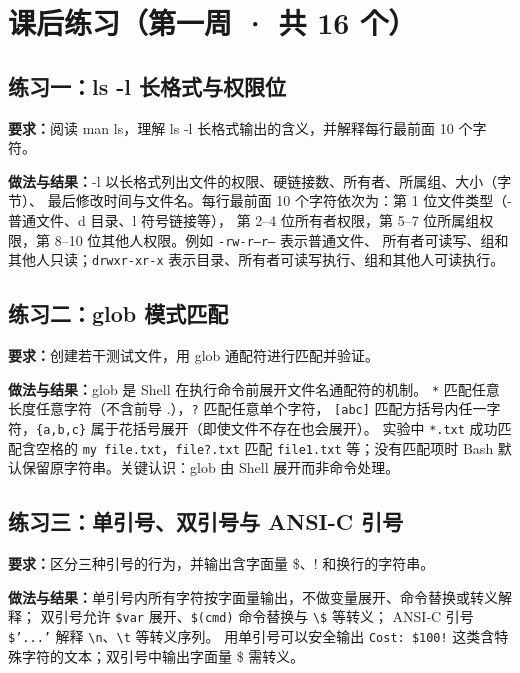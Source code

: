\documentclass[UTF8]{ctexart}
\begin{document}

\section{课后练习（第一周 · 共 16 个）}

\subsection{练习一：ls -l 长格式与权限位}

\noindent\textbf{要求：}阅读 man ls，理解 ls -l 长格式输出的含义，并解释每行最前面 10 个字符。

\noindent\textbf{做法与结果：}-l 以长格式列出文件的权限、硬链接数、所有者、所属组、大小（字节）、
最后修改时间与文件名。每行最前面 10 个字符依次为：第 1 位文件类型（- 普通文件、d 目录、l 符号链接等），
第 2--4 位所有者权限，第 5--7 位所属组权限，第 8--10 位其他人权限。例如 \texttt{-rw-r--r--} 表示普通文件、
所有者可读写、组和其他人只读；\texttt{drwxr-xr-x} 表示目录、所有者可读写执行、组和其他人可读执行。

\subsection{练习二：glob 模式匹配}

\noindent\textbf{要求：}创建若干测试文件，用 glob 通配符进行匹配并验证。

\noindent\textbf{做法与结果：}glob 是 Shell 在执行命令前展开文件名通配符的机制。
\texttt{*} 匹配任意长度任意字符（不含前导 .），\texttt{?} 匹配任意单个字符，
\texttt{[abc]} 匹配方括号内任一字符，\texttt{\{a,b,c\}} 属于花括号展开（即使文件不存在也会展开）。
实验中 \texttt{*.txt} 成功匹配含空格的 \texttt{my file.txt}，\texttt{file?.txt} 匹配
\texttt{file1.txt} 等；没有匹配项时 Bash 默认保留原字符串。关键认识：glob 由 Shell 展开而非命令处理。

\subsection{练习三：单引号、双引号与 ANSI-C 引号}

\noindent\textbf{要求：}区分三种引号的行为，并输出含字面量 \$、! 和换行的字符串。

\noindent\textbf{做法与结果：}单引号内所有字符按字面量输出，不做变量展开、命令替换或转义解释；
双引号允许 \texttt{\$var} 展开、\texttt{\$(cmd)} 命令替换与 \texttt{\textbackslash \$} 等转义；
ANSI-C 引号 \texttt{\$'...'} 解释 \texttt{\textbackslash n}、\texttt{\textbackslash t} 等转义序列。
用单引号可以安全输出 \texttt{Cost: \$100!} 这类含特殊字符的文本；双引号中输出字面量 \$ 需转义。
\end{document}
